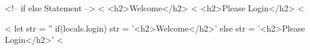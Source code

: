 <!-- if else Statement  -->
    <%
      <h2>Welcome</h2>
    <%
      <h2>Please Login</h2>
    <%

    <%
      let str = ''
      if(locals.login){
        str = '<h2>Welcome</h2>'
      }
      else{
        str = '<h2>Please Login</h2>'
      }
    <%